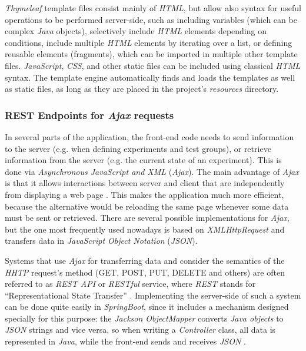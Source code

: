\documentclass[a4paper]{usiinfbachelorproject}
\begin{document}
\emph{Thymeleaf} template files consist mainly of \emph{HTML}, but allow also syntax for useful operations to
be performed server-side, such as including variables (which can be complex \emph{Java} objects),
selectively include \emph{HTML} elements depending on conditions, include multiple \emph{HTML} elements
by iterating over a list, or defining reusable elements (fragments), which can be imported in
multiple other template files. \emph{JavaScript}, \emph{CSS}, and other static files can be included
using classical \emph{HTML} syntax. The template engine automatically finds and loads the templates as well as
static files, as long as they are placed in the project's \emph{resources} directory.

\subsubsection{\textbf{REST Endpoints for \emph{Ajax} requests}}

In several parts of the application, the front-end code needs to send information to the
server (e.g. when defining experiments and test groups), or retrieve
information from the server (e.g. the current state of an experiment). This is done via
\emph{Asynchronous JavaScript and XML} (\emph{Ajax}).
The main advantage of \emph{Ajax} is that it allows interactions between server and client that are independently from
displaying a web page \cite{ajaxWikipedia}. This makes the application much more efficient, because the alternative would be reloading
the same page whenever some data must be sent or retrieved.
There are several possible implementations for \emph{Ajax}, but the one most frequently used nowadays is based on
\emph{XMLHttpRequest} and transfers data in \emph{JavaScript Object Notation} (\emph{JSON}).

Systems that use \emph{Ajax} for transferring data and consider the semantics of the \emph{HHTP} request's method
(GET, POST, PUT, DELETE and others) are often referred to as \emph{REST API} or \emph{RESTful} service,
where \emph{REST} stands for ``Representational State Transfer'' \cite{restWikipedia}. Implementing the
server-side of such a system can be done quite easily in \emph{SpringBoot}, since it includes a mechanism
designed specially for this purpose: the \emph{Jackson ObjectMapper} converts \emph{Java objects} to \emph{JSON} strings
and vice versa, so when writing a \emph{Controller} class, all data is represented in \emph{Java}, while
the front-end sends and receives \emph{JSON} \cite{baeldungJackson}. 
\end{document}
